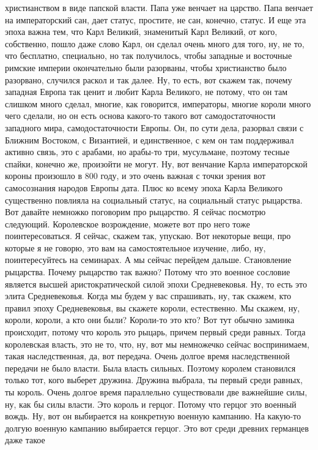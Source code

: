 христианством в виде папской власти. Папа уже венчает на царство. Папа венчает
на императорский сан, дает статус, простите, не сан, конечно, статус. И еще эта
эпоха важна тем, что Карл Великий, знаменитый Карл Великий, от кого, собственно,
пошло даже слово Карл, он сделал очень много для того, ну, не то, что бесплатно,
специально, но так получилось, чтобы западные и восточные римские империи
окончательно были разорваны, чтобы христианство было разорвано, случился раскол
и так далее. Ну, то есть, вот скажем так, почему западная Европа так ценит и
любит Карла Великого, не потому, что он там слишком много сделал, многие, как
говорится, императоры, многие короли много чего сделали, но он есть основа
какого-то такого вот самодостаточности западного мира, самодостаточности Европы.
Он, по сути дела, разорвал связи с Ближним Востоком, с Византией, и
единственное, с кем он там поддерживал активно связь, это с арабами, но арабы-то
три, мусульмане, поэтому тесные спайки, конечно же, произойти не могут. Ну, вот
венчание Карла императорской короны произошло в 800 году, и это очень важная с
точки зрения вот самосознания народов Европы дата. Плюс ко всему эпоха Карла
Великого существенно повлияла на социальный статус, на социальный статус
рыцарства. Вот давайте немножко поговорим про рыцарство. Я сейчас посмотрю
следующий. Королевское возрождение, можете вот про него тоже поинтересоваться. Я
сейчас, скажем так, упускаю. Вот некоторые вещи, про которые я не говорю, это
вам на самостоятельное изучение, либо, ну, поинтересуйтесь на семинарах. А мы
сейчас перейдем дальше. Становление рыцарства. Почему рыцарство так важно?
Потому что это военное сословие является высшей аристократической силой эпохи
Средневековья. Ну, то есть это элита Средневековья. Когда мы будем у вас
спрашивать, ну, так скажем, кто правил эпоху Средневековья, вы скажете короли,
естественно. Мы скажем, ну, короли, короли, а кто они были? Короли-то это кто?
Вот тут обычно заминка происходит, потому что король это рыцарь, причем первый
среди равных. Тогда королевская власть, это не то, что, ну, вот мы немножечко
сейчас воспринимаем, такая наследственная, да, вот передача. Очень долгое время
наследственной передачи не было власти. Была власть сильных. Поэтому королем
становился только тот, кого выберет дружина. Дружина выбрала, ты первый среди
равных, ты король. Очень долгое время параллельно существовали две важнейшие
силы, ну, как бы силы власти. Это король и герцог. Потому что герцог это военный
вождь. Ну, вот он выбирается на конкретную военную кампанию. На какую-то долгую
военную кампанию выбирается герцог. Это вот среди древних германцев даже такое
